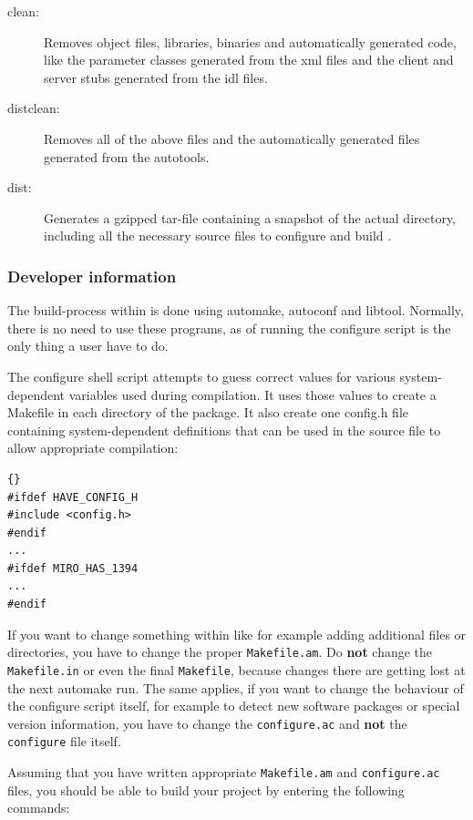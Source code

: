 \documentclass[10pt]{book}
\begin{document}
\begin{description}
\item[clean:] Removes object files, libraries, binaries and
  automatically generated code, like the parameter classes generated
  from the xml files and the client and server stubs generated from
  the idl files.
\item[distclean:] Removes all of the above files and the automatically
  generated files generated from the autotools.
\item[dist:] Generates a gzipped tar-file containing a snapshot of the
  actual \miro directory, including all the necessary source files to
  configure and build \miro.
\end{description}

\subsubsection{Developer information}

The build-process within \miro is done using automake, autoconf and
libtool. Normally, there is no need to use these programs, as of
running the configure script is the only thing a user have to do.

The configure shell script attempts to guess correct values for
various system-dependent variables used during compilation. It uses
those values to create a Makefile in each directory of the package.
It also create one config.h file containing system-dependent
definitions that can be used in the source file to allow appropriate
compilation:

\begin{lstlisting}[frame=tb]{}
#ifdef HAVE_CONFIG_H
#include <config.h>
#endif
...
#ifdef MIRO_HAS_1394
...
#endif
\end{lstlisting}

If you want to change something within \miro like for example adding
additional files or directories, you have to change the proper
\texttt{Makefile.am}. Do \textbf{not} change the \texttt{Makefile.in}
or even the final \texttt{Makefile}, because changes there are getting
lost at the next automake run. The same applies, if you want to
change the behaviour of the configure script itself, for example to
detect new software packages or special version information, you have
to change the \texttt{configure.ac} and \textbf{not} the
\texttt{configure} file itself.

Assuming that you have written appropriate \texttt{Makefile.am} and
\texttt{configure.ac} files, you should be able to build your project
by entering the following commands:
\end{document}
